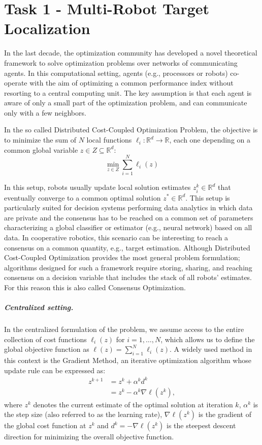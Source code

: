 \chapter{Task 1 - Multi-Robot Target Localization}
\label{ch:consensus}
In the last decade, the optimization community has developed a novel theoretical framework to solve optimization problems over networks of communicating agents. In this computational setting, agents (e.g., processors or robots) co-operate with the aim of optimizing a common performance index without resorting to a central computing unit. The key assumption is that each agent is aware of only a small part of the optimization problem, and can communicate only with a few neighbors.

In the so called Distributed Cost-Coupled Optimization Problem, the objective is to minimize the sum of $N$ local functions $\ell_i : \mathbb{R}^d \rightarrow \mathbb{R}$, each one depending on a common global variable $z \in Z \subseteq \mathbb{R}^d$: \\
\[\underset{z \in Z}{\min} \sum_{i=1}^N\ell_i(z)\]

In this setup, robots usually update local solution estimates $z_i^k \in \mathbb{R}^d$ that eventually converge to a common optimal solution $z^* \in \mathbb{R}^d$. This setup is particularly suited for decision systems performing data analytics in which data are private and the consensus has to be reached on a common set of parameters characterizing a global classifier or estimator (e.g., neural network) based on all data. In cooperative robotics, this scenario can be interesting to reach a consensus on a common quantity, e.g., target estimation. Although Distributed Cost-Coupled Optimization provides the most general problem formulation; algorithms designed for such a framework require storing, sharing, and reaching consensus on a decision variable that includes the stack of all robots' estimates. \cite{TutorialOnDistributedOptimizationCooperativeRobotics} For this reason this is also called Consensus Optimization. 




\paragraph{Centralized setting.}
In the centralized formulation of the problem, we assume access to the entire collection of cost functions $\ell_i(z)$ for $i = 1, \dots, N$, which allows us to define the global objective function as $\ell(z) = \sum_{i=1}^N \ell_i(z)$. A widely used method in this context is the Gradient Method, an iterative optimization algorithm whose update rule can be expressed as:
\begin{align*}
z^{k+1} &= z^k + \alpha^kd^k \\ 
        &= z^k - \alpha^k \nabla \ell(z^k),
\end{align*}
where $z^k$ denotes the current estimate of the optimal solution at iteration $k$, $\alpha^k$ is the step size (also referred to as the learning rate), $\nabla \ell(z^k)$ is the gradient of the global cost function at $z^k$ and $d^k=-\nabla \ell(z^k)$ is the steepest descent direction for minimizing the overall objective function.


